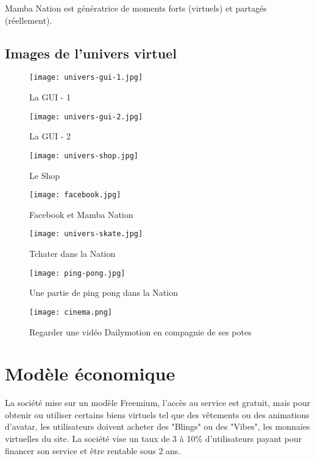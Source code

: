 Mamba Nation est génératrice de moments forts (virtuels) et partagés
(réellement).

\subsection{Images de l'univers virtuel} 

\begin{figure}[H]
  \texttt{[image: univers-gui-1.jpg]}
  \caption{La GUI - 1}
\end{figure}


\begin{figure}[H]
    \texttt{[image: univers-gui-2.jpg]}
  \caption{La GUI - 2}
\end{figure}


\begin{figure}[H]
  \texttt{[image: univers-shop.jpg]}
  \caption{Le Shop}
\end{figure}

\begin{figure}[H]
  \texttt{[image: facebook.jpg]}
  \caption{Facebook et Mamba Nation}
\end{figure}

\begin{figure}[H]
  \texttt{[image: univers-skate.jpg]}
  \caption{Tchater dans la Nation}
\end{figure}

\begin{figure}[H]
  \texttt{[image: ping-pong.jpg]}
  \caption{Une partie de ping pong dans la Nation}
\end{figure}

\begin{figure}[H]
  \texttt{[image: cinema.png]}
  \caption{Regarder une vidéo Dailymotion en compagnie de ses potes}
\end{figure}


\section{Modèle économique}

La société mise sur un modèle Freemium, l'accès au service est gratuit, mais
pour obtenir ou utiliser certains biens virtuels tel que des vêtements ou des
animations d'avatar, les utilisateurs doivent acheter des "Blings" ou des
"Vibes", les monnaies virtuelles du site. La société vise un taux de 3 à 10\%
d'utilisateurs payant pour financer son service et être rentable sous 2 ans.

